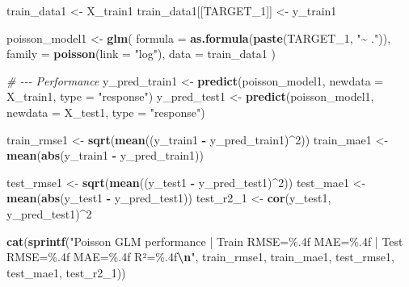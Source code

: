 \documentclass[
]{article}
\newenvironment{Shaded}{\begin{snugshade}}{\end{snugshade}}
\newcommand{\AttributeTok}[1]{\textcolor[rgb]{0.13,0.29,0.53}{#1}}
\newcommand{\CommentTok}[1]{\textcolor[rgb]{0.56,0.35,0.01}{\textit{#1}}}
\newcommand{\DecValTok}[1]{\textcolor[rgb]{0.00,0.00,0.81}{#1}}
\newcommand{\FunctionTok}[1]{\textcolor[rgb]{0.13,0.29,0.53}{\textbf{#1}}}
\newcommand{\NormalTok}[1]{#1}
\newcommand{\OtherTok}[1]{\textcolor[rgb]{0.56,0.35,0.01}{#1}}
\newcommand{\SpecialCharTok}[1]{\textcolor[rgb]{0.81,0.36,0.00}{\textbf{#1}}}
\newcommand{\StringTok}[1]{\textcolor[rgb]{0.31,0.60,0.02}{#1}}
\begin{document}
\begin{Shaded}
\begin{Highlighting}[]
\NormalTok{train\_data1 }\OtherTok{\textless{}{-}}\NormalTok{ X\_train1}
\NormalTok{train\_data1[[TARGET\_1]] }\OtherTok{\textless{}{-}}\NormalTok{ y\_train1}

\NormalTok{poisson\_model1 }\OtherTok{\textless{}{-}} \FunctionTok{glm}\NormalTok{(}
  \AttributeTok{formula =} \FunctionTok{as.formula}\NormalTok{(}\FunctionTok{paste}\NormalTok{(TARGET\_1, }\StringTok{"\textasciitilde{} ."}\NormalTok{)),}
  \AttributeTok{family =} \FunctionTok{poisson}\NormalTok{(}\AttributeTok{link =} \StringTok{"log"}\NormalTok{),}
  \AttributeTok{data =}\NormalTok{ train\_data1}
\NormalTok{)}

\CommentTok{\# {-}{-}{-} Performance}
\NormalTok{y\_pred\_train1 }\OtherTok{\textless{}{-}} \FunctionTok{predict}\NormalTok{(poisson\_model1, }\AttributeTok{newdata =}\NormalTok{ X\_train1, }\AttributeTok{type =} \StringTok{"response"}\NormalTok{)}
\NormalTok{y\_pred\_test1 }\OtherTok{\textless{}{-}} \FunctionTok{predict}\NormalTok{(poisson\_model1, }\AttributeTok{newdata =}\NormalTok{ X\_test1, }\AttributeTok{type =} \StringTok{"response"}\NormalTok{)}

\NormalTok{train\_rmse1 }\OtherTok{\textless{}{-}} \FunctionTok{sqrt}\NormalTok{(}\FunctionTok{mean}\NormalTok{((y\_train1 }\SpecialCharTok{{-}}\NormalTok{ y\_pred\_train1)}\SpecialCharTok{\^{}}\DecValTok{2}\NormalTok{))}
\NormalTok{train\_mae1 }\OtherTok{\textless{}{-}} \FunctionTok{mean}\NormalTok{(}\FunctionTok{abs}\NormalTok{(y\_train1 }\SpecialCharTok{{-}}\NormalTok{ y\_pred\_train1))}

\NormalTok{test\_rmse1 }\OtherTok{\textless{}{-}} \FunctionTok{sqrt}\NormalTok{(}\FunctionTok{mean}\NormalTok{((y\_test1 }\SpecialCharTok{{-}}\NormalTok{ y\_pred\_test1)}\SpecialCharTok{\^{}}\DecValTok{2}\NormalTok{))}
\NormalTok{test\_mae1 }\OtherTok{\textless{}{-}} \FunctionTok{mean}\NormalTok{(}\FunctionTok{abs}\NormalTok{(y\_test1 }\SpecialCharTok{{-}}\NormalTok{ y\_pred\_test1))}
\NormalTok{test\_r2\_1 }\OtherTok{\textless{}{-}} \FunctionTok{cor}\NormalTok{(y\_test1, y\_pred\_test1)}\SpecialCharTok{\^{}}\DecValTok{2}

\FunctionTok{cat}\NormalTok{(}\FunctionTok{sprintf}\NormalTok{(}\StringTok{"Poisson GLM performance | Train RMSE=\%.4f MAE=\%.4f | Test RMSE=\%.4f MAE=\%.4f R²=\%.4f}\SpecialCharTok{\textbackslash{}n}\StringTok{"}\NormalTok{,}
\NormalTok{            train\_rmse1, train\_mae1, test\_rmse1, test\_mae1, test\_r2\_1))}


\end{Highlighting}
\end{Shaded}
\end{document}
